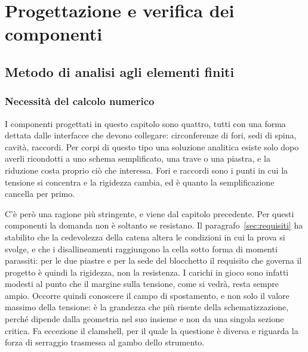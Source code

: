 \chapter{Progettazione e verifica dei componenti}
\label{cap:progettazione}


\section{Metodo di analisi agli elementi finiti}
\label{sec:metodo-fem}

\subsection{Necessità del calcolo numerico}
\label{sec:fem-necessita}

I componenti progettati in questo capitolo sono quattro, tutti con una forma dettata dalle interfacce che devono collegare:
circonferenze di fori, sedi di spina, cavità, raccordi. Per corpi di questo tipo
una soluzione analitica esiste solo dopo averli ricondotti a uno schema
semplificato, una trave o una piastra, e la riduzione costa proprio ciò che
interessa. Fori e raccordi sono i punti in cui la tensione si concentra e la
rigidezza cambia, ed è quanto la semplificazione cancella per primo.

C'è però una ragione più stringente, e viene dal capitolo precedente. Per questi
componenti la domanda non è soltanto se resistano. Il
paragrafo~\ref{sec:requisiti} ha stabilito che la cedevolezza della catena
altera le condizioni in cui la prova si svolge, e che i disallineamenti
raggiungono la cella sotto forma di momenti parassiti: per le due piastre e per
la sede del blocchetto il requisito che governa il progetto è quindi la
rigidezza, non la resistenza. I carichi
in gioco sono infatti modesti al punto che il margine sulla tensione, come si
vedrà, resta sempre ampio. Occorre quindi conoscere il campo di spostamento, e
non solo il valore massimo della tensione: è la grandezza che più risente della
schematizzazione, perché dipende dalla geometria nel suo insieme e non da una
singola sezione critica. Fa eccezione il clamshell, per il quale la questione è
diversa e riguarda la forza di serraggio trasmessa al gambo dello strumento.

